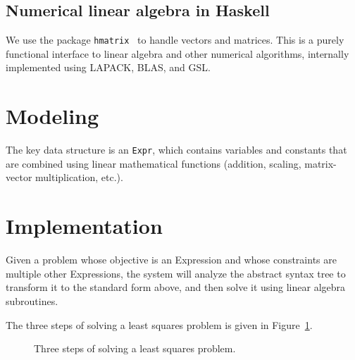 \documentclass[12pt]{article}
\begin{document}
\subsection{Numerical linear algebra in Haskell}

We use the package \verb|hmatrix|~\cite{ruiz2015hmatrix-0.17.0.1} to handle
vectors and matrices.
This is a purely functional interface to linear algebra and other numerical
algorithms, internally implemented using LAPACK, BLAS, and GSL.

\section{Modeling}

The key data structure is an \verb|Expr|, which contains variables and constants
that are combined using linear mathematical functions (addition, scaling,
matrix-vector multiplication, etc.).

\section{Implementation}

Given a problem whose objective is an Expression and whose constraints are
multiple other Expressions, the system will analyze the abstract syntax tree to
transform it to the standard form above, and then solve it using linear algebra
subroutines.

The three steps of solving a least squares problem is given in Figure~\ref{fig:steps}.
\begin{figure}[!ht]
  \centering
  \caption{Three steps of solving a least squares problem.}
  \label{fig:steps}
\end{figure}
\end{document}
